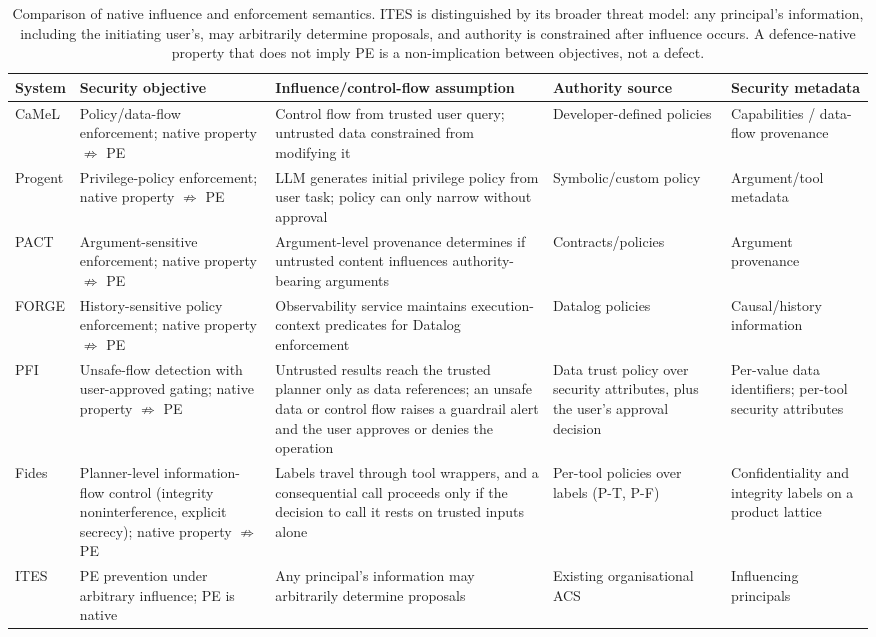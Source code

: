 \documentclass{article}
\begin{document}
\begin{table}[t]
\centering
\small
\renewcommand{\arraystretch}{1.2}
\begin{tabular}{p{1.5cm}p{2.5cm}p{3.2cm}p{2.5cm}p{2.2cm}}
\toprule
\textbf{System} & \textbf{Security objective} & \textbf{Influence/control-flow assumption} &
\textbf{Authority source} & \textbf{Security metadata} \\
\midrule
CaMeL & Policy/data-flow enforcement; native property $\not\Rightarrow$ PE & Control flow from trusted user query; untrusted data constrained from modifying it & Developer-defined policies & Capabilities / data-flow provenance \\
Progent & Privilege-policy enforcement; native property $\not\Rightarrow$ PE & LLM generates initial privilege policy from user task; policy can only narrow without approval & Symbolic/custom policy & Argument/tool metadata \\
PACT & Argument-sensitive enforcement; native property $\not\Rightarrow$ PE & Argument-level provenance determines if untrusted content influences authority-bearing arguments & Contracts/policies & Argument provenance \\
FORGE & History-sensitive policy enforcement; native property $\not\Rightarrow$ PE & Observability service maintains execution-context predicates for Datalog enforcement & Datalog policies & Causal/history information \\
PFI & Unsafe-flow detection with user-approved gating; native property $\not\Rightarrow$ PE & Untrusted results reach the trusted planner only as data references; an unsafe data or control flow raises a guardrail alert and the user approves or denies the operation & Data trust policy over security attributes, plus the user's approval decision & Per-value data identifiers; per-tool security attributes \\
Fides & Planner-level information-flow control (integrity noninterference, explicit secrecy); native property $\not\Rightarrow$ PE & Labels travel through tool wrappers, and a consequential call proceeds only if the decision to call it rests on trusted inputs alone & Per-tool policies over labels (P-T, P-F) & Confidentiality and integrity labels on a product lattice \\
ITES & PE prevention under arbitrary influence; PE is native & Any principal's information may arbitrarily determine proposals & Existing organisational ACS & Influencing principals \\
\bottomrule
\end{tabular}
\caption{Comparison of native influence and enforcement semantics.
ITES is distinguished by its broader threat model: any principal's information,
including the initiating user's, may arbitrarily determine proposals, and
authority is constrained after influence occurs. A defence-native property
that does not imply PE is a non-implication between objectives, not a defect.}
\label{tab:comparison}
\end{table}
\end{document}
